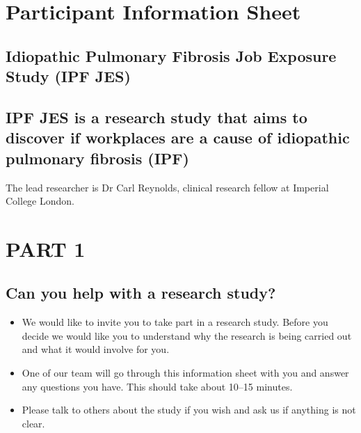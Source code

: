 \documentclass[a4paper,10pt]{article}
\date{}
\begin{document}
\pagestyle{fancy} 





\section*{Participant Information Sheet}

\subsection*{Idiopathic Pulmonary Fibrosis Job Exposure Study (IPF JES)}
\subsection*{IPF JES is a research study that aims to discover if workplaces are a cause of idiopathic pulmonary fibrosis (IPF)}

The lead researcher is Dr Carl Reynolds, clinical research fellow at Imperial College London.

\section*{PART 1}
\subsection*{Can you help with a research study?}

\begin{itemize}
 \item We would like to invite you to take part in a research study. Before you decide we would like you to understand why the research is being carried out and what it would involve for you.  
 \item One of our team will go through this information sheet with you and answer any questions you have. This should take about 10--15 minutes.
 \item Please talk to others about the study if you wish and ask us if anything is not clear.
\end{itemize}
\end{document}
